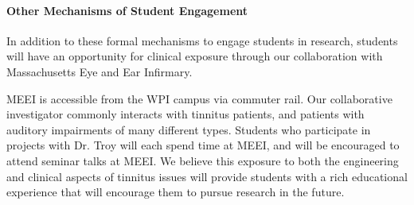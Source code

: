 \documentclass[11pt, notitlepage]{article} %
\begin{document}
\paragraph{Other Mechanisms of Student Engagement}
In addition to these formal mechanisms to engage students in research, students will have an opportunity for clinical exposure through our collaboration with Massachusetts Eye and Ear Infirmary. 

MEEI is accessible from the WPI campus via commuter rail. Our collaborative investigator commonly interacts with tinnitus patients, and patients with auditory impairments of many different types. Students who participate in projects with Dr. Troy will each spend time at MEEI, and will be encouraged to attend seminar talks at MEEI. We believe this exposure to both the engineering and clinical aspects of tinnitus issues will provide students with a rich educational experience that will encourage them to pursue research in the future.





\end{document}
